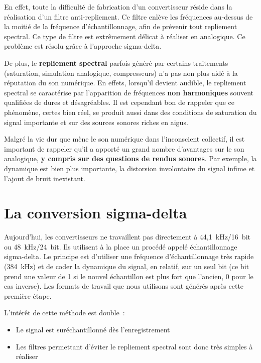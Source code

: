 \documentclass[
]{book}
\providecommand{\tightlist}{%
  \setlength{\itemsep}{0pt}\setlength{\parskip}{0pt}}
\begin{document}
En effet, toute la difficulté de fabrication d'un convertisseur réside dans la réalisation d'un filtre anti-repliement. Ce filtre enlève les fréquences au-dessus de la moitié de la fréquence d'échantillonnage, afin de prévenir tout repliement spectral. Ce type de filtre est extrêmement délicat à réaliser en analogique. Ce problème est résolu grâce à l'approche sigma-delta.

De plus, le \textbf{repliement spectral} parfois généré par certains traitements (saturation, simulation analogique, compresseurs) n'a pas non plus aidé à la réputation du son numérique. En effets, lorsqu'il devient audible, le repliement spectral se caractérise par l'apparition de fréquences \textbf{non harmoniques} souvent qualifiées de dures et désagréables. Il est cependant bon de rappeler que ce phénomène, certes bien réel, se produit aussi dans des conditions de saturation du signal importante et sur des sources sonores riches en aigus.

Malgré la vie dur que mène le son numérique dans l'inconscient collectif, il est important de rappeler qu'il a apporté un grand nombre d'avantages sur le son analogique, \textbf{y compris sur des questions de rendus sonores}. Par exemple, la dynamique est bien plus importante, la distorsion involontaire du signal infime et l'ajout de bruit inexistant.

\hypertarget{la-conversion-sigma-delta}{%
\section{La conversion sigma-delta}\label{la-conversion-sigma-delta}}

Aujourd'hui, les convertisseurs ne travaillent pas directement à 44,1~kHz/16~bit ou 48~kHz/24~bit. Ils utilisent à la place un procédé appelé échantillonnage sigma-delta. Le principe est d'utiliser une fréquence d'échantillonnage très rapide (384~kHz) et de coder la dynamique du signal, en relatif, sur un seul bit (ce bit prend une valeur de 1 si le nouvel échantillon est plus fort que l'ancien, 0 pour le cas inverse). Les formats de travail que nous utilisons sont générés après cette première étape.

L'intérêt de cette méthode est double~:

\begin{itemize}
\tightlist
\item
  Le signal est suréchantillonné dès l'enregistrement
\item
  Les filtres permettant d'éviter le repliement spectral sont donc très simples à réaliser
\end{itemize}
\end{document}
